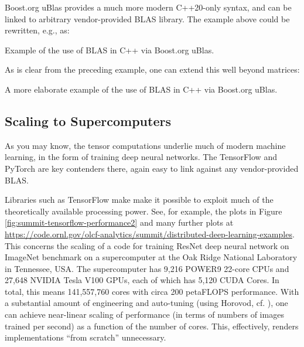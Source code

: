 Boost.org uBlas provides a much more modern C++20-only syntax,
and can be linked to arbitrary vendor-provided BLAS library.
The example above could be rewritten, e.g., as:

\begin{codebox}[breakable]{}
    \footnotesize Example of the use of BLAS in C++ via Boost.org uBlas.
    \tcblower
\end{codebox}

As is clear from the preceding example, one can extend this well beyond matrices:

\begin{codebox}[breakable]{}
        \footnotesize A more elaborate example of the use of BLAS in C++ via Boost.org uBlas.
        \tcblower
\end{codebox}

\subsection{Scaling to Supercomputers}

As you may know, the tensor computations underlie much of modern machine learning,
in the form of training deep neural networks. 
The TensorFlow and PyTorch are key contenders there, 
again easy to link against any vendor-provided BLAS. 

Libraries such as TensorFlow make make it possible to
exploit much of the theoretically available processing 
power. See, for example, the plots 
in Figure \ref{fig:summit-tensorflow-performance2} and 
many further plots at 
\url{https://code.ornl.gov/olcf-analytics/summit/distributed-deep-learning-examples}.
This concerns the scaling of a code for training ResNet deep neural network on ImageNet 
benchmark on a supercomputer at the Oak Ridge National Laboratory 
in Tennessee, USA. 
The supercomputer has 
9,216 POWER9 22-core CPUs and 
27,648 NVIDIA Tesla V100 GPUs, each of which has 
5,120 CUDA Cores. 
In total, this means 141,557,760 cores with circa
200 petaFLOPS performance.
With a substantial amount of engineering and 
auto-tuning (using Horovod, cf. \cite{8945109}), one can achieve
near-linear scaling of performance (in terms of numbers of images trained per second) 
as a function of the number of cores. 
This, effectively, renders implementations 
``from scratch'' unnecessary. 

